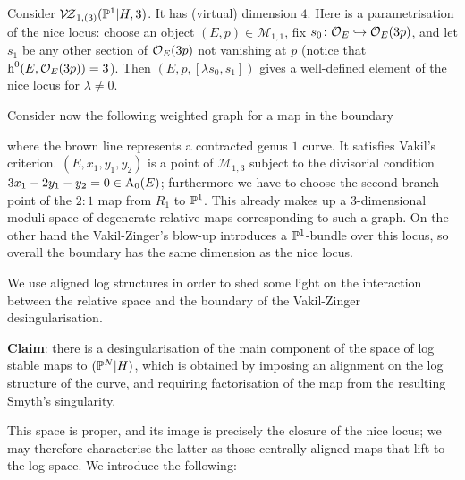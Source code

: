 \begin{example}
Consider $\mathcal{V\!Z}_{1,(3)}(\mathbb P^1|H,3)$. It has (virtual) dimension $4$. Here is a parametrisation of the nice locus: choose an object $(E,p) \in \mathcal{M}_{1,1}$, fix $s_0 \colon\mathcal{O}_E\hookrightarrow\mathcal{O}_E(3p)$, and let $s_1$ be any other section of $\mathcal{O}_E(3p)$ not vanishing at $p$ (notice that $\operatorname{h}^0(E,\mathcal{O}_E(3p))=3$). Then $(E,p,[\lambda s_0,s_1])$ gives a well-defined element of the nice locus for $\lambda \neq 0$.

Consider now the following weighted graph for a map in the boundary
\begin{center}
\end{center}
where the brown line represents a contracted genus $1$ curve. It satisfies Vakil's criterion. $(E,x_1,y_1,y_2)$ is a point of $\mathcal{M}_{1,3}$ subject to the divisorial condition $3x_1-2y_1-y_2=0\in \operatorname{A}_0(E)$; furthermore we have to choose the second branch point of the $2:1$ map from $R_1$ to $\mathbb P^1$. This already makes up a $3$-dimensional moduli space of degenerate relative maps corresponding to such a graph. On the other hand the Vakil-Zinger's blow-up introduces a $\mathbb P^1$-bundle over this locus, so overall the boundary has the same dimension as the nice locus.
\end{example}
We use aligned log structures in order to shed some light on the interaction between the relative space and the boundary of the Vakil-Zinger desingularisation.

\textbf{Claim}: there is a desingularisation of the main component of the space of log stable maps to $(\mathbb P^N|H)$, which is obtained by imposing an alignment on the log structure of the curve, and requiring factorisation of the map from the resulting Smyth's singularity.

This space is proper, and its image is precisely the closure of the nice locus; we may therefore characterise the latter as those centrally aligned maps that lift to the log space. We introduce the following:

